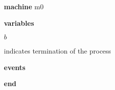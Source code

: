 \begin{block}
  \item   \textbf{machine} m0
  \item   \textbf{variables}
  \begin{block}
    \item   $b$
    \item   \begin{block}
      \item    indicates termination of the process 
    \end{block}
  \end{block}
  \item   
  \item   \textbf{events}
  \begin{block}
    \item   
  \end{block}
  \item   \textbf{end} \\
\end{block}
